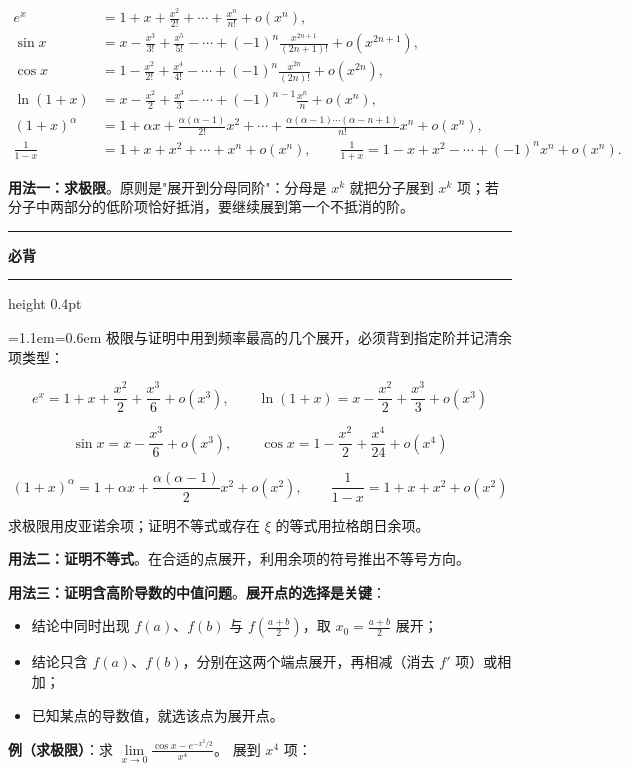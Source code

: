 \documentclass[11pt,openany,UTF8]{ctexbook}
\newcommand{\callouthead}[2]{%
  \par\addvspace{7pt}\noindent
  {\color{#1}\rule[-0.15em]{3pt}{1.05em}}\hspace{0.5em}%
  {\bfseries\color{#1}#2}\par\nobreak\vspace{-0.35em}%
  {\color{rulesep}\hrule height 0.4pt}\nobreak\vspace{0.45em}%
  \begingroup\small\setlength{\parindent}{0pt}%
  \leftskip=1.1em\rightskip=0.6em\noindent\ignorespaces}
\newcommand{\calloutend}{\par\endgroup\addvspace{7pt}}
\newenvironment{callkey}[1]{\callouthead{keybar}{#1}}{\calloutend}
\begin{document}
\[\begin{aligned}
e^x&=1+x+\frac{x^2}{2!}+\cdots+\frac{x^n}{n!}+o(x^n),\\
\sin x&=x-\frac{x^3}{3!}+\frac{x^5}{5!}-\cdots+(-1)^{n}\frac{x^{2n+1}}{(2n+1)!}+o(x^{2n+1}),\\
\cos x&=1-\frac{x^2}{2!}+\frac{x^4}{4!}-\cdots+(-1)^{n}\frac{x^{2n}}{(2n)!}+o(x^{2n}),\\
\ln(1+x)&=x-\frac{x^2}{2}+\frac{x^3}{3}-\cdots+(-1)^{n-1}\frac{x^n}{n}+o(x^n),\\
(1+x)^\alpha&=1+\alpha x+\frac{\alpha(\alpha-1)}{2!}x^2+\cdots+\frac{\alpha(\alpha-1)\cdots(\alpha-n+1)}{n!}x^n+o(x^n),\\
\frac{1}{1-x}&=1+x+x^2+\cdots+x^n+o(x^n),\qquad \frac{1}{1+x}=1-x+x^2-\cdots+(-1)^nx^n+o(x^n).
\end{aligned}\]

\textbf{用法一：求极限}。原则是"展开到分母同阶"：分母是 $x^k$ 就把分子展到 $x^k$ 项；若分子中两部分的低阶项恰好抵消，要继续展到第一个不抵消的阶。

\begin{callkey}{必背}
极限与证明中用到频率最高的几个展开，必须背到指定阶并记清余项类型：

\[e^x=1+x+\frac{x^2}{2}+\frac{x^3}{6}+o(x^3),\qquad \ln(1+x)=x-\frac{x^2}{2}+\frac{x^3}{3}+o(x^3)\]

\[\sin x=x-\frac{x^3}{6}+o(x^3),\qquad \cos x=1-\frac{x^2}{2}+\frac{x^4}{24}+o(x^4)\]

\[(1+x)^{\alpha}=1+\alpha x+\frac{\alpha(\alpha-1)}{2}x^2+o(x^2),\qquad \frac{1}{1-x}=1+x+x^2+o(x^2)\]

求极限用皮亚诺余项；证明不等式或存在 $\xi$ 的等式用拉格朗日余项。

\end{callkey}

\textbf{用法二：证明不等式}。在合适的点展开，利用余项的符号推出不等号方向。

\textbf{用法三：证明含高阶导数的中值问题}。\textbf{展开点的选择是关键}：

\begin{itemize}
\item 结论中同时出现 $f(a)$、$f(b)$ 与 $f\left(\frac{a+b}{2}\right)$，取 $x_0=\frac{a+b}{2}$ 展开；
\item 结论只含 $f(a)$、$f(b)$，分别在这两个端点展开，再相减（消去 $f'$ 项）或相加；
\item 已知某点的导数值，就选该点为展开点。
\end{itemize}
\textbf{例（求极限）}：求 $\lim\limits_{x\to 0}\frac{\cos x-e^{-x^2/2}}{x^4}$。 展到 $x^4$ 项：
\end{document}
